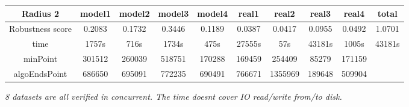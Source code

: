 \documentclass{article}
\begin{document}
\begin{table}[!htbp]
\begin{adjustwidth}{-1cm}{}
\begin{threeparttable}
\begin{tabular}{|c|c|c|c|c|c|c|c|c|c|}
			\textbf{Radius 2} & \textbf{model1} & \textbf{model2} & \textbf{model3} & \textbf{model4} & \textbf{real1} & \textbf{real2} & \textbf{real3} & \textbf{real4} & \textbf{total} \\ \hline
			Robustness score                 & 0.2083          & 0.1732          & 0.3446          & 0.1189          & 0.0387         & 0.0417         & 0.0955         & 0.0492         & 1.0701         \\ \hline
			time                             & 1757s           & 716s            & 1734s           & 475s            & 27555s         & 57s            & 43181s         & 1005s          & 43181s         \\ \hline
			minPoint                         & 301512          & 260039          & 518751          & 170288          & 169459         & 254409         & 85279          & 171159         &                \\ \hline
			algoEndsPoint                    & 686650          & 695091          & 772235          & 690491          & 766671         & 1355969        & 189648         & 509904         &                \\ \hline
	
		\end{tabular}
		\begin{tablenotes}
			\small
			\item\textit{ 8 datasets are all verified in concurrent. The time doesn\textquotesingle t cover IO read/write from/to disk.}
		\end{tablenotes}			
		\end{threeparttable}
		\end{adjustwidth}	
	\end{table}
	
\end{document}
